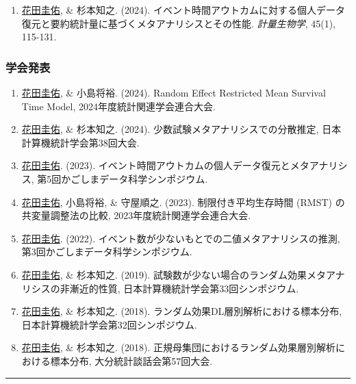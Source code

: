 \documentclass[
  12pt,
]{article}
\providecommand{\tightlist}{%
  \setlength{\itemsep}{0pt}\setlength{\parskip}{0pt}}
\begin{document}
\begin{enumerate}
\def\labelenumi{\arabic{enumi}.}
\tightlist
\item
  \underline{花田圭佑}, \& 杉本知之. (2024).
  イベント時間アウトカムに対する個人データ復元と要約統計量に基づくメタアナリシスとその性能.
  \emph{計量生物学}, 45(1), 115-131.
\end{enumerate}

\hypertarget{ux5b66ux4f1aux767aux8868}{%
\subsubsection{学会発表}\label{ux5b66ux4f1aux767aux8868}}

\begin{enumerate}
\def\labelenumi{\arabic{enumi}.}
\tightlist
\item
  \underline{花田圭佑}, \& 小島将裕. (2024). Random Effect Restricted
  Mean Survival Time Model, 2024年度統計関連学会連合大会.
\item
  \underline{花田圭佑}, \& 杉本知之. (2024).
  少数試験メタアナリシスでの分散推定, 日本計算機統計学会第38回大会.
\item
  \underline{花田圭佑}. (2023).
  イベント時間アウトカムの個人データ復元とメタアナリシス,
  第5回かごしまデータ科学シンポジウム.
\item
  \underline{花田圭佑}, 小島将裕, \& 守屋順之. (2023).
  制限付き平均生存時間 (RMST) の共変量調整法の比較,
  2023年度統計関連学会連合大会.
\item
  \underline{花田圭佑}. (2022).
  イベント数が少ないもとでの二値メタアナリシスの推測,
  第3回かごしまデータ科学シンポジウム.
\item
  \underline{花田圭佑}, \& 杉本知之. (2019).
  試験数が少ない場合のランダム効果メタアナリシスの非漸近的性質,
  日本計算機統計学会第33回シンポジウム.
\item
  \underline{花田圭佑}, \& 杉本知之. (2018).
  ランダム効果DL層別解析における標本分布,
  日本計算機統計学会第32回シンポジウム.
\item
  \underline{花田圭佑}, \& 杉本知之. (2018).
  正規母集団におけるランダム効果層別解析における標本分布,
  大分統計談話会第57回大会.
\end{enumerate}

\begin{center}\rule{0.5\linewidth}{0.5pt}\end{center}
\end{document}
